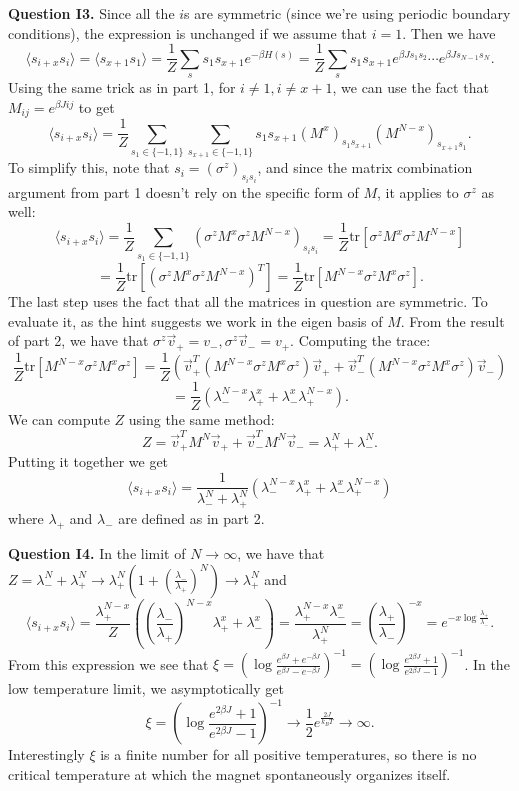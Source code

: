 \documentclass[letterpaper, reqno,11pt]{article}
\begin{document}
{\medskip\noindent\bf Question I3.} Since all the $i$s are symmetric (since we're using periodic boundary conditions), the expression is unchanged if we assume that $i=1$. Then we have
\[
    \langle s_{i+x}s_i \rangle =\langle s_{x+1}s_1 \rangle =\frac{1}{Z}\sum_{s} s_1 s_{x+1}e^{-\beta H(s)}=\frac{1}{Z}\sum_{s} s_1 s_{x+1}e^{\beta Js_1s_2}\cdots e^{\beta Js_{N-1}s_N}
.\]
Using the same trick as in part 1, for $i\neq 1, i\neq x+1$, we can use the fact that $M_{ij}=e^{\beta J ij}$ to get
\[
    \langle s_{i+x}s_i \rangle= \frac{1}{Z}\sum_{s_1\in \{-1,1\}}\sum_{s_{x+1}\in \{-1,1\}}s_1s_{x+1}(M^{x})_{s_1s_{x+1}}(M^{N-x})_{s_{x+1}s_1}
.\]
To simplify this, note that $s_i=\left( \sigma^{z} \right)_{s_is_i}$, and since the matrix combination argument from part 1 doesn't rely on the specific form of $M$, it applies to $\sigma^{z}$ as well:
\[
    \langle s_{i+x}s_i \rangle= \frac{1}{Z}\sum_{s_1\in \{-1,1\}}\left( \sigma^{z}M^{x}\sigma^{z}M^{N-x} \right)_{s_is_i}=\frac{1}{Z}\text{tr}\left[ \sigma^{z}M^{x}\sigma^{z}M^{N-x} \right]
\]
\[
=\frac{1}{Z}\text{tr}\left[ \left(\sigma^{z}M^{x}\sigma^{z}M^{N-x}\right)^{T} \right]=\frac{1}{Z}\text{tr}\left[ M^{N-x}\sigma^{z}M^{x}\sigma^{z} \right]
.\]
The last step uses the fact that all the matrices in question are symmetric. To evaluate it, as the hint suggests we work in the eigen basis of $M$. From the result of part 2, we have that $\sigma^{z}\vec v_+=v_-, \sigma^{z}\vec v_-=v_+$. Computing the trace:
\[
\frac{1}{Z}\text{tr}\left[ M^{N-x}\sigma^{z}M^{x}\sigma^{z} \right]=\frac{1}{Z}\left( \vec v_+^{T}(M^{N-x}\sigma^{z}M^{x}\sigma^{z})\vec v_++\vec v_-^{T}(M^{N-x}\sigma^{z}M^{x}\sigma^{z})\vec v_- \right)
\]
\[
 =\frac{1}{Z}\left( \lambda_-^{N-x}\lambda_+^{x}+\lambda_-^{x}\lambda_+^{N-x} \right)
.\]
We can compute $Z$ using the same method:
\[
Z=\vec v_+^{T}M^{N}\vec v_+ + \vec v_-^{T}M^{N}\vec v_- = \lambda_+^{N}+\lambda_-^{N}
.\]
Putting it together we get
\[
\langle s_{i+x}s_i \rangle = \frac{1}{\lambda_-^{N}+\lambda_+^{N}} \left( \lambda_-^{N-x}\lambda_+^{x}+\lambda_-^{x}\lambda_+^{N-x} \right)
\]
where $\lambda_+$ and $\lambda_-$ are defined as in part 2.

{\medskip\noindent\bf Question I4.} In the limit of $N\to\infty$, we have that $Z=\lambda_-^{N}+\lambda_+^{N}\to \lambda_+^{N}\left( 1+\left(\frac{\lambda_-}{\lambda_+}\right)^{N} \right) \to\lambda_+^{N}$ and
\[
\langle s_{i+x}s_i \rangle = \frac{\lambda_+^{N-x}}{Z}\left( \left(\frac{\lambda_-}{\lambda_+}\right)^{N-x}\lambda_+^{x}+\lambda_-^{x} \right) =\frac{\lambda_+^{N-x}\lambda_-^{x}}{\lambda_+^{N}}=\left( \frac{\lambda_+}{\lambda_-} \right) ^{-x}=e^{-x\log \frac{\lambda_+}{\lambda_-}}
.\]
From this expression we see that $\xi=\left(\log \frac{e^{\beta J}+e^{-\beta J}}{e^{\beta J}-e^{-\beta J}}\right)^{-1}=\left(\log \frac{e^{2\beta J}+1}{e^{2\beta J}-1}\right)^{-1}$. In the low temperature limit, we asymptotically get
\[
\xi = \left(\log \frac{e^{2\beta J}+1}{e^{2\beta J}-1}\right)^{-1}\to \frac{1}{2}e^{\frac{2J}{k_BT}}\to\infty
.\]
Interestingly $\xi$ is a finite number for all positive temperatures, so there is no critical temperature at which the magnet spontaneously organizes itself.
\end{document}
